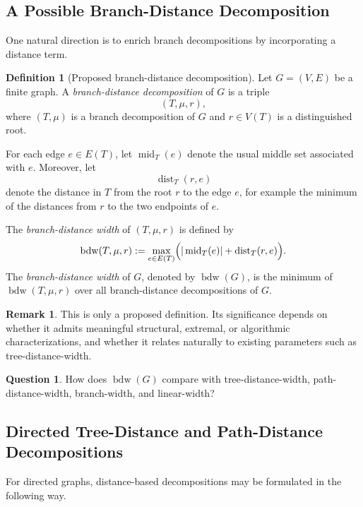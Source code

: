 \documentclass[10pt]{book}
\theoremstyle{definition}
\newtheorem{remark}[theorem]{Remark}
\newtheorem{definition}[theorem]{Definition}
\newtheorem{question}[theorem]{Question}
\begin{document}
\subsection{A Possible Branch-Distance Decomposition}

One natural direction is to enrich branch decompositions by incorporating a distance term.

\begin{definition}[Proposed branch-distance decomposition]
Let \(G=(V,E)\) be a finite graph.
A \emph{branch-distance decomposition} of \(G\) is a triple
\[
(T,\mu,r),
\]
where \((T,\mu)\) is a branch decomposition of \(G\) and \(r\in V(T)\) is a distinguished root.

For each edge \(e\in E(T)\), let \(\operatorname{mid}_T(e)\) denote the usual middle set associated with \(e\).
Moreover, let
\[
\operatorname{dist}_T(r,e)
\]
denote the distance in \(T\) from the root \(r\) to the edge \(e\), for example the minimum of the distances from \(r\) to the two endpoints of \(e\).

The \emph{branch-distance width} of \((T,\mu,r)\) is defined by
\[
\operatorname{bdw}(T,\mu,r):=
\max_{e\in E(T)}
\Bigl(
|\operatorname{mid}_T(e)|+\operatorname{dist}_T(r,e)
\Bigr).
\]
The \emph{branch-distance width} of \(G\), denoted by \(\operatorname{bdw}(G)\), is the minimum of \(\operatorname{bdw}(T,\mu,r)\) over all branch-distance decompositions of \(G\).
\end{definition}

\begin{remark}
This is only a proposed definition.
Its significance depends on whether it admits meaningful structural, extremal, or algorithmic characterizations, and whether it relates naturally to existing parameters such as tree-distance-width.
\end{remark}

\begin{question}
How does \(\operatorname{bdw}(G)\) compare with tree-distance-width, path-distance-width, branch-width, and linear-width?
\end{question}

\subsection{Directed Tree-Distance and Path-Distance Decompositions}

For directed graphs, distance-based decompositions may be formulated in the following way.
\end{document}
